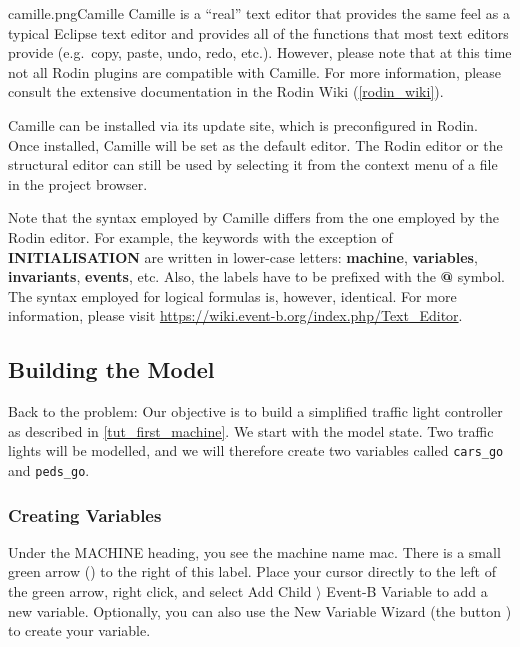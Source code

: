 \begin{rodin-plugin}{camille.png}{Camille}
Camille is a ``real'' text editor that provides the same feel as a typical Eclipse text editor and provides all of the functions that most text editors provide (e.g.\ copy, paste, undo, redo, etc.).  However, please note that at this time not all Rodin plugins are compatible with Camille.  For more information, please consult the extensive documentation in the Rodin Wiki (\ref{rodin_wiki}).

Camille can be installed via its update site, which is preconfigured in Rodin.  Once installed, Camille will be set as the default editor.
The Rodin editor or the structural editor can still be used by selecting it from the context menu of a file in the project browser.

Note that the syntax employed by Camille differs from the one employed by the Rodin editor.
For example, the keywords with the exception of \textbf{INITIALISATION} are written in lower-case letters: \textbf{machine}, \textbf{variables}, \textbf{invariants}, \textbf{events}, etc. Also, the labels have to be prefixed with the \textbf{@} symbol.
The syntax employed for logical formulas is, however, identical.
For more information, please visit \url{https://wiki.event-b.org/index.php/Text_Editor}.


\end{rodin-plugin}

\subsection{Building the Model}
\label{tut_building_the_model}

Back to the problem: Our objective is to build a simplified traffic light controller as described in \ref{tut_first_machine}.  We start with the model state.  Two traffic lights will be modelled, and we will therefore create two variables called  \texttt{cars\_go} and \texttt{peds\_go}.  

\subsubsection{Creating Variables}

Under the \textsf{MACHINE} heading, you see the machine name \textsf{mac}. There is a small green arrow () to the right of this label. Place your cursor directly to the left of the green arrow, right click, and select \textsf{Add Child $\rangle$ Event-B Variable} to add a new variable. Optionally, you can also use the New Variable Wizard (the button ) to create your variable. 

